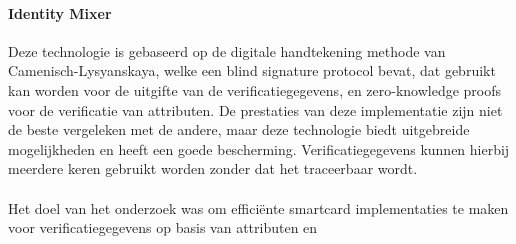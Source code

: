 \paragraph{Identity Mixer}
Deze technologie is gebaseerd op de digitale handtekening methode van 
Camenisch-Lysyanskaya, welke een blind signature protocol bevat, dat gebruikt kan worden voor de 
uitgifte van de verificatiegegevens, en zero-knowledge proofs voor de 
verificatie van attributen. De prestaties van deze implementatie zijn niet de 
beste vergeleken met de andere, maar deze technologie biedt uitgebreide 
mogelijkheden en heeft een goede bescherming. Verificatiegegevens kunnen 
hierbij meerdere keren gebruikt worden zonder dat het traceerbaar wordt.

\paragraph{}
Het doel van het onderzoek was om efficiënte smartcard implementaties te maken 
voor verificatiegegevens op basis van attributen en

